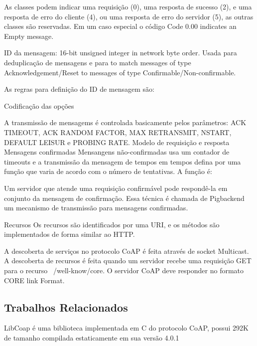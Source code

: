    As classes podem indicar uma requisição (0), uma resposta de sucesso (2), e uma resposta de erro do cliente (4), ou uma resposta de erro do servidor (5), as outras classes são reservadas. Em um caso especial o c\'odigo Code 0.00 indicates an Empty message.

   ID da mensagem:  16-bit unsigned integer in network byte order. Usada para deduplicação de mensagens e para to match messages of type Acknowledgement/Reset to messages of type Confirmable/Non-confirmable.

    As regras para definição do ID de mensagem são:
   
Codificação das opç\~oes

A transmissão de mensagems \'e controlada basicamente pelos par\^ametros: ACK TIMEOUT, ACK RANDOM FACTOR, MAX RETRANSMIT, NSTART, DEFAULT LEISUR e PROBING RATE.
Modelo de requisição e resposta Mensagens confirmadas Mensangens não-confirmadas usa um contador de timeouts e a transmissão da mensagem de tempos em tempos defina por uma função que varia de acordo com o número de tentativas.
A função \'e:

Um servidor que atende uma requisição confirm\'avel pode respondê-la em conjunto da mensagem de confirmação. Essa t\'ecnica \'e chamada de Pigbackend um mecanismo de transmissão para mensagens confirmadas.\cite{draft-ietf-core-coap-18}

Recursos
Os recursos são identificados por uma URI, e os m\'etodos são implementados de forma similar ao HTTP.

A descoberta de serviços no protocolo CoAP \'e feita atrav\'es de socket Multicast.
A descoberta de recursos \'e feita quando um servidor recebe uma requisição GET para o recurso ~/well-know/core. O servidor CoAP deve responder no formato CORE link Format.\cite{rfc6690}

\subsection{Trabalhos Relacionados}

LibCoap \'e uma biblioteca implementada em C do protocolo CoAP, possui 292K de tamanho compilada estaticamente em sua versão 4.0.1

